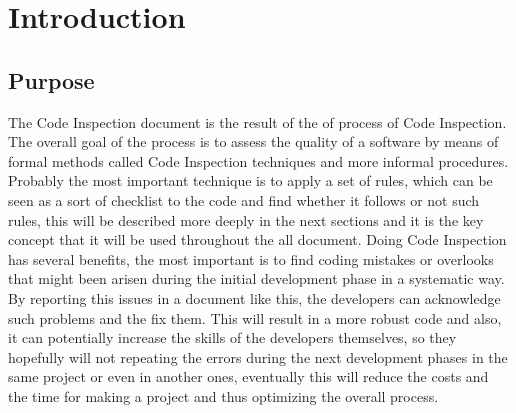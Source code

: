 \break
\section{Introduction}
\subsection{Purpose}
The Code Inspection document is the result of the of process of Code Inspection. The overall goal of the process is to assess the quality of a software by means of formal methods called Code Inspection techniques and more informal procedures. \newline
Probably the most important technique is to apply a set of rules, which can be seen as a sort of checklist to the code and find whether it follows or not such rules, this will be described more deeply in the next sections and it is the key concept that it will be used throughout the all document. \newline
Doing Code Inspection has several benefits, the most important is to find coding mistakes or overlooks that might been arisen during the initial development phase in a systematic way. By reporting this issues in a document like this, the developers can acknowledge such problems and the fix them. This will result in a more robust code and also, it can potentially increase the skills of the developers themselves, so they hopefully will not repeating the errors during the next development phases in the same project or even in another ones, eventually this will reduce the costs and the time for making a project and thus optimizing the overall process.
